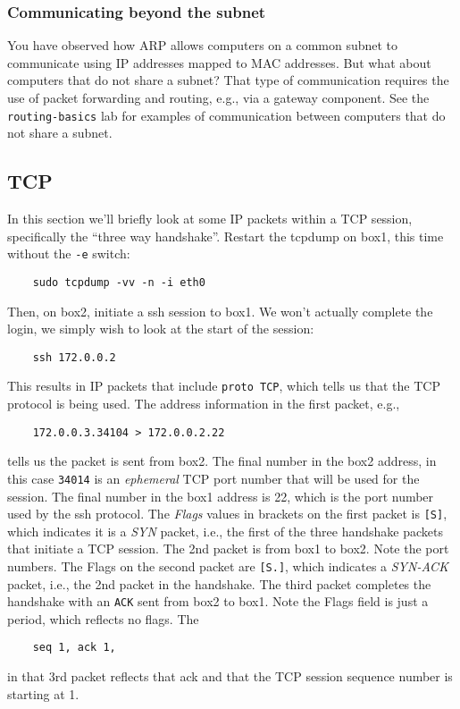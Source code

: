 \subsubsection{Communicating beyond the subnet}
You have observed how ARP allows computers on a common subnet to communicate using IP addresses mapped to MAC
addresses.  But what about computers
that do not share a subnet?  That type of communication requires the use of packet forwarding and routing, e.g., via a 
gateway component.  See the {\tt routing-basics} lab for examples of communication between computers that do not share
a subnet.

\subsection{TCP}
In this section we'll briefly look at some IP packets within a TCP session, specifically the ``three way handshake''.
Restart the tcpdump on box1, this time without the {\tt -e} switch:
\begin{verbatim}
    sudo tcpdump -vv -n -i eth0
\end{verbatim}
\noindent Then, on box2, initiate a ssh session to box1.  We won't actually complete the login, we simply wish to look at the start
of the session:
\begin{verbatim}
    ssh 172.0.0.2
\end{verbatim}

This results in IP packets that include {\tt proto TCP}, which tells us that the TCP protocol is being used.
The address information in the first packet, e.g.,
\begin{verbatim}
    172.0.0.3.34104 > 172.0.0.2.22
\end{verbatim}
\noindent tells us the packet is sent from box2.  The final number in the box2 address, in this case {\tt 34014}
is an \textit{ephemeral} TCP port number that will be used for the session.  The final number in the box1 address is
22, which is the port number used by the ssh protocol.  The \textit{Flags} values in brackets on the first packet
is {\tt [S]}, which indicates it is a \textit{SYN} packet, i.e., the first of the three handshake packets that initiate a TCP 
session.  The 2nd packet is from box1 to box2.  Note the port numbers.  The Flags on the second packet are {\tt [S.]},
which indicates a \textit{SYN-ACK} packet, i.e., the 2nd packet in the handshake.  The third packet completes the handshake
with an {\tt ACK} sent from box2 to box1. Note the Flags field is just a period, which reflects no flags.  The 
\begin{verbatim}
    seq 1, ack 1, 
\end{verbatim}
\noindent in that 3rd packet reflects that ack and that the TCP session sequence number is starting at 1.

